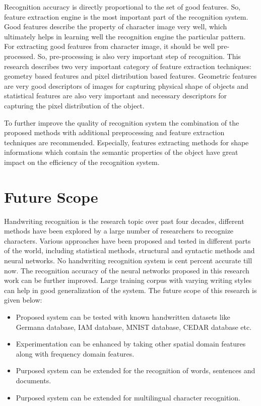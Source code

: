 Recognition accuracy is directly proportional to the set of good features. So, feature extraction engine is the most important part of the recognition system. Good features describe the property of character image very well, which ultimately helps in learning well the recognition engine the particular pattern. For extracting good features from character image, it should be well pre-processed. So, pre-processing is also very important step of recognition. This research describes two very important category of feature extraction techniques: geometry based features and pixel distribution based features. Geometric features are very good descriptors of images for capturing physical shape of objects and statistical features are also very important and necessary descriptors for capturing the pixel distribution of the object.

To further improve the quality of recognition system the combination of the proposed methods with additional preprocessing and feature extraction techniques are recommended. Especially, features extracting methods for shape informations which contain the semantic properties of the object have great impact on the efficiency of the recognition system.

\section{Future Scope}
Handwriting recognition is the research topic over past four decades, different methods have been explored by a large number of researchers to recognize characters. Various approaches have been proposed and tested in different parts of the world, including statistical methods, structural and syntactic methods and neural networks. No handwriting recognition system is cent percent accurate till now. The recognition accuracy of the neural networks proposed in this research work can be further improved. Large training corpus with varying writing styles can help in good generalization of the system. The future scope of this research is given below:
\begin{itemize}
\item Proposed system can be tested with known handwritten datasets like Germana database, IAM database, MNIST database, CEDAR database etc.
\item Experimentation can be enhanced by taking other spatial domain features along with frequency domain features.
\item Purposed system can be extended for the recognition of words, sentences and documents.
\item Purposed system can be extended for multilingual character recognition.
\end{itemize}